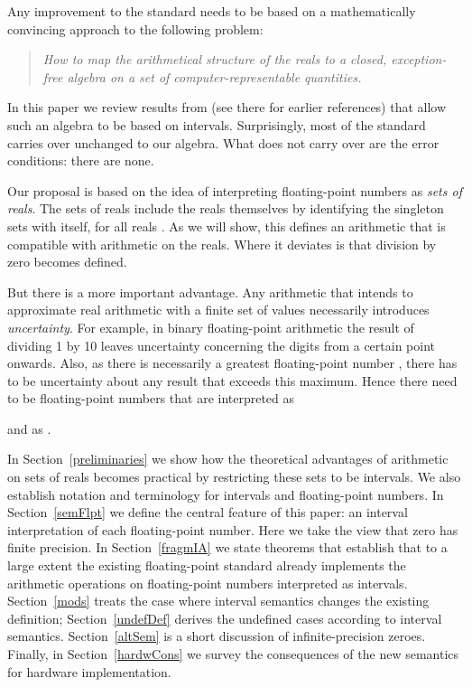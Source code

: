 \documentclass[11pt]{article}
\begin{document}
Any improvement to the standard needs to be based on a mathematically
convincing approach to the following problem:
\begin{quote}
\emph{
How to map the
arithmetical structure of the reals to a closed, exception-free algebra
on a set of computer-representable quantities.
}
\end{quote}
In this paper we review results from \cite{hckvnmdn01} (see there for
earlier references) that allow such an algebra to be based on
intervals.  Surprisingly, most of the standard carries over unchanged
to our algebra. What does not carry over are the error conditions:
there are none.

Our proposal is based on the idea of interpreting floating-point
numbers as \emph{sets of reals}.  The sets of reals include the reals
themselves by identifying the singleton sets  with  itself,
for all reals .  As we will show, this defines an arithmetic that
is compatible with arithmetic on the reals.  Where it deviates is that
division by zero becomes defined.

But there is a more important advantage.
Any arithmetic that intends to approximate real arithmetic with a
finite set of values necessarily introduces \emph{uncertainty}.
For example, in binary floating-point arithmetic the result of dividing 1 by 10
leaves uncertainty concerning the digits from a certain point onwards.
Also, as there is necessarily a greatest floating-point number ,
there has to be uncertainty about any result that exceeds this
maximum.
Hence there need to be floating-point numbers that are interpreted as

and as
.

In Section~\ref{preliminaries} we show how the theoretical advantages
of arithmetic on sets of reals becomes practical by restricting these
sets to be intervals. We also establish notation and terminology for
intervals and floating-point numbers.  In Section~\ref{semFlpt} we
define the central feature of this paper: an interval interpretation
of each floating-point number.  Here we take the view that zero has
finite precision.  In Section~\ref{fragmIA} we state theorems that
establish that to a large extent the existing floating-point standard
already implements the arithmetic operations on floating-point numbers
interpreted as intervals.  Section~\ref{mods} treats the case where
interval semantics changes the existing definition;
Section~\ref{undefDef} derives the undefined cases according to
interval semantics.  Section~\ref{altSem} is a short discussion of
infinite-precision zeroes.  Finally, in Section~\ref{hardwCons} we
survey the consequences of the new semantics for hardware
implementation.
\end{document}
